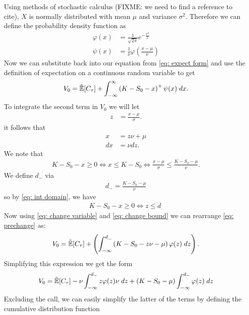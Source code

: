 \documentclass[reqno]{amsart}
\begin{document}
Using methods of stochastic calculus (FIXME: we need to find a reference to cite), $X$ is normally distributed with mean $\mu$ and variance $\sigma^2$. Therefore we can define the probability density function as
\begin{align}
     \label{eq: phi-PDF}
     \varphi(x) &=\frac{1}{\sqrt{2\pi}}e^{-\frac{x^2}{2}}\\
     \psi(x) &= \frac{1}{\nu}\varphi(\frac{x-\mu}{\nu})
\end{align}
Now we can substitute back into our equation from \eqref{eq: expect form} and use the definition of expectation on a continuous random variable to get 
\begin{align} \label{eq: prechange}
     V_0 = \tilde{\mathbb{E}}[C_\tau] + \int_{-\infty}^{\infty}\left(K- S_0 - x\right)^+ \psi(x) \; dx.
\end{align}
To integrate the second term in $V_0$ we will let
\begin{align}
     z &= \frac{x-\mu}{\sigma}.
\end{align}
it follows that 
\begin{align}\label{eq: change variable}
     x &= z\nu + \mu\\
     dx &= \nu dz.
\end{align}
We note that 
\begin{align} \label{eq: int domain}
    K - S_0 - x \ge 0 \Longleftrightarrow x \leq K- S_0 \Longleftrightarrow  \frac{x-\mu}{\sigma} \leq \frac{K-S_0-\mu}{\nu}.
\end{align}
We define $d_-$ via
\begin{align}
      d_- =  \frac{K-S_0-\mu}{\nu}
\end{align}
so by \eqref{eq: int domain}, we have 
\begin{align} \label{eq: change bound}
     K - S_0 - x \ge 0  \Longleftrightarrow z \leq d_.
\end{align}
Now using \eqref{eq: change variable} and \eqref{eq: change bound} we can rearrange \eqref{eq: prechange} as:
\begin{align}
     V_0 = \tilde{\mathbb{E}}[C_\tau] + \left(\int_{-\infty}^{d\_}\left(K- S_0 - z\nu - \mu\right)\varphi(z) \; dz\right).
\end{align}
Simplifying this expression we get the form
\begin{align}
     V_0 = \tilde{\mathbb{E}}[C_\tau] - \nu \int_{-\infty}^{d_-}z\varphi(z)\nu \; dz +  (K- S_0 - \mu)\int_{-\infty}^{d_-}\varphi(z) \; dz 
\end{align}
Excluding the call, we can easily simplify the latter of the terms by defining the cumulative distribution function
\end{document}
